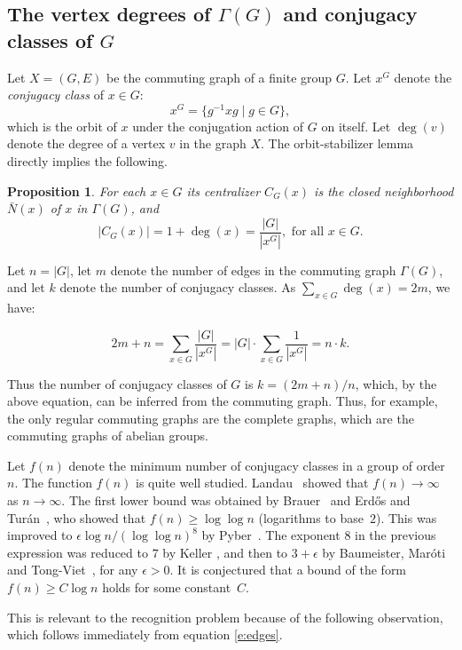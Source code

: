 \documentclass{elsarticle}
\newtheorem{prop}[theorem]{Proposition}
\begin{document}
\subsection{The vertex degrees of $\Gamma(G)$ and conjugacy classes of $G$}

Let $X=(G,E)$ be the commuting graph of a finite group $G$.  Let $x^G$
denote the \emph{conjugacy class} of $x\in G$:
\[
x^G = \{g^{-1}xg\mid g\in G\},
\]
which is the orbit of $x$ under the conjugation action of $G$ on
itself. Let $\deg(v)$ denote the degree of a vertex $v$ in the graph
$X$.
The orbit-stabilizer lemma \cite{permgps} directly implies the following.

\begin{prop}
  For each $x\in G$ its centralizer $C_G(x)$ is the closed neighborhood
  $\bar{N}(x)$ of $x$ in $\Gamma(G)$, and
  \[
|C_G(x)| = 1+ \deg(x) = {\frac{|G|}{|x^G|}}, \textrm{ for all }x\in G.
  \]
\end{prop}

Let $n=|G|$, let $m$ denote the number of edges in the commuting graph $\Gamma(G)$,
and let $k$ denote the number of conjugacy classes.  As $\sum_{x\in
  G}\deg(x) = 2m$, we have:

\begin{equation}
2m +n = \sum_{x\in G} {\frac{|G|}{|x^G|}} = |G|\cdot \sum_{x\in
  G}{\frac{1}{|x^G|}} = n\cdot k.
\label{e:edges}
\end{equation}

Thus the number of conjugacy classes of $G$ is $k=(2m+n)/n$, which, by
the above equation, can be inferred from the commuting graph. Thus,
for example, the only regular commuting graphs are the complete
graphs, which are the commuting graphs of abelian groups.

Let $f(n)$ denote the minimum number of conjugacy classes in a group
of order~$n$. The function $f(n)$ is quite well
studied. Landau~\cite{La} showed that $f(n)\to\infty$ as
$n\to\infty$. The first lower bound was obtained by
Brauer~\cite{Brauer} and Erd\H{o}s and Tur\'an~\cite{ET}, who showed
that $f(n)\ge\log\log n$ (logarithms to base~$2$). This was improved
to $\epsilon\log n/(\log\log n)^8$ by Pyber~\cite{Py}. The exponent
$8$ in the previous expression was reduced to $7$ by Keller
\cite{Keller}, and then to $3+\epsilon$ by Baumeister,
Mar\'oti and Tong-Viet~\cite{BMT-V}, for any $\epsilon>0$. It is
conjectured that a bound of the form $f(n)\ge C\log n$ holds for some
constant~$C$.

This is relevant to the recognition problem because of the following
observation, which follows immediately from equation \eqref{e:edges}.
\end{document}
